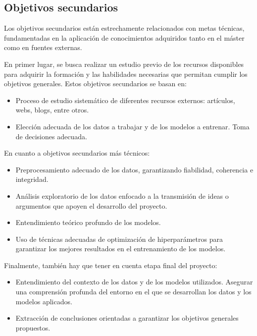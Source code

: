 \documentclass[12pt,a4paper]{report}
\begin{document}
\subsection{Objetivos secundarios}

Los objetivos secundarios están estrechamente relacionados con metas técnicas, fundamentadas en la aplicación de conocimientos adquiridos tanto en el máster como en fuentes externas.

En primer lugar, se busca realizar un estudio previo de los recursos disponibles para adquirir la formación y las habilidades necesarias que permitan cumplir los objetivos generales. Estos objetivos secundarios se basan en:

\begin{itemize}
    \item Proceso de estudio sistemático de diferentes recursos externos: artículos, webs, blogs, entre otros.

    \item Elección adecuada de los datos a trabajar y de los modelos a entrenar. Toma de decisiones adecuada. 
\end{itemize}

En cuanto a objetivos secundarios más técnicos:

\begin{itemize}
\item Preprocesamiento adecuado de los datos, garantizando fiabilidad, coherencia e integridad.

\item Análisis exploratorio de los datos enfocado a la transmisión de ideas o argumentos que apoyen el desarrollo del proyecto.

\item Entendimiento teórico profundo de los modelos.

\item Uso de técnicas adecuadas de optimización de hiperparámetros para garantizar los mejores resultados en el entrenamiento de los modelos.
\end{itemize}

Finalmente, también hay que tener en cuenta etapa final del proyecto:

\begin{itemize}
    \item Entendimiento del contexto de los datos y de los modelos utilizados. Asegurar una comprensión profunda del entorno en el que se desarrollan los datos y los modelos aplicados.

    \item Extracción de conclusiones orientadas a garantizar los objetivos generales propuestos.
\end{itemize}
\end{document}

